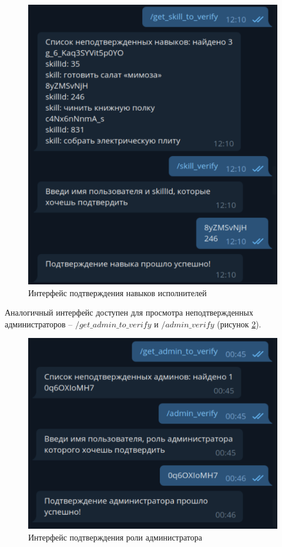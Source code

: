 \begin{figure}[H]
	\begin{center}
		\includegraphics[page=1,scale=0.5]{assets/skill_verify.pdf}
	\end{center}
	\caption{Интерфейс подтверждения навыков исполнителей}
	\label{skill_verify}
\end{figure}

Аналогичный интерфейс доступен для просмотра неподтвержденных администраторов -- $/get\_admin\_to\_verify$ и $/admin\_verify$ (рисунок \ref{admin_verify}).

\begin{figure}[H]
	\begin{center}
		\includegraphics[page=1,scale=0.5]{assets/admin_verify.pdf}
	\end{center}
	\caption{Интерфейс подтверждения роли администратора}
	\label{admin_verify}
\end{figure}


